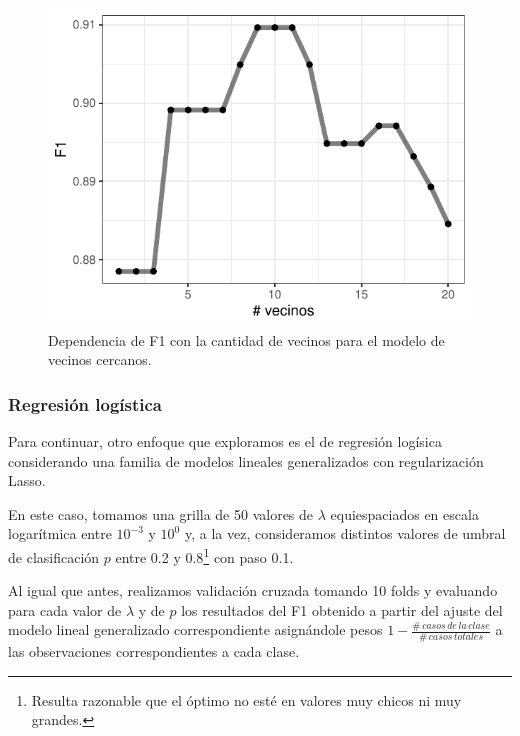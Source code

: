 \documentclass[
]{article}
\begin{document}
\begin{figure}[H]

{\centering \includegraphics{Charaf-Spiousas_Clasificacion0_files/figure-latex/unnamed-chunk-6-1} 

}

\caption{\label{fig:knn}Dependencia de F1 con la cantidad de vecinos para el modelo de vecinos cercanos.}\label{fig:unnamed-chunk-6}
\end{figure}

\hypertarget{regresiuxf3n-loguxedstica}{%
\subsubsection{Regresión logística}\label{regresiuxf3n-loguxedstica}}

Para continuar, otro enfoque que exploramos es el de regresión logísica
considerando una familia de modelos lineales generalizados con
regularización Lasso.

En este caso, tomamos una grilla de 50 valores de \(\lambda\)
equiespaciados en escala logarítmica entre \(10^{-3}\) y \(10^0\) y, a
la vez, consideramos distintos valores de umbral de clasificación \(p\)
entre 0.2 y 0.8\footnote{Resulta razonable que el óptimo no esté en
  valores muy chicos ni muy grandes.} con paso 0.1.

Al igual que antes, realizamos validación cruzada tomando 10 folds y
evaluando para cada valor de \(\lambda\) y de \(p\) los resultados del
F1 obtenido a partir del ajuste del modelo lineal generalizado
correspondiente asignándole pesos
\(1-\frac{\# \, casos \, de \, la \,clase }{\# \, casos \, totales}\) a
las observaciones correspondientes a cada clase.
\end{document}
